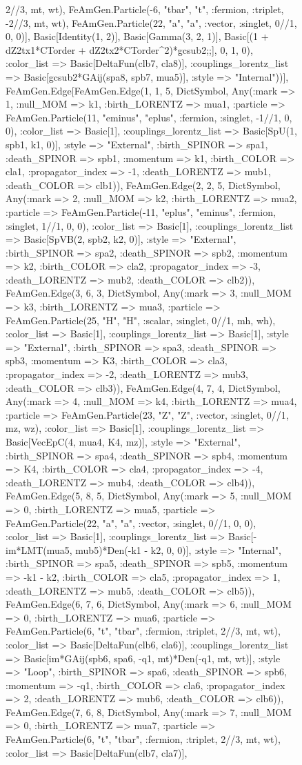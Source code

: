 \documentclass{revtex4}
\begin{document}
\begin{figure}[!htb]
\begin{center}
{2//3, mt, wt), FeAmGen.Particle(-6, "tbar", "t", :fermion, :triplet, -2//3, mt, wt), FeAmGen.Particle(22, "a", "a", :vector, :singlet, 0//1, 0, 0)], Basic[Identity(1, 2)], Basic[Gamma(3, 2, 1)], Basic[(1 + dZ2tx1*CTorder + dZ2tx2*CTorder^2)*gcsub2;;], 0, 1, 0), :color_list => Basic[DeltaFun(clb7, cla8)], :couplings_lorentz_list => Basic[gcsub2*GAij(spa8, spb7, mua5)], :style => "Internal"))], FeAmGen.Edge[FeAmGen.Edge(1, 1, 5, Dict{Symbol, Any}(:mark => 1, :null_MOM => k1, :birth_LORENTZ => mua1, :particle => FeAmGen.Particle(11, "eminus", "eplus", :fermion, :singlet, -1//1, 0, 0), :color_list => Basic[1], :couplings_lorentz_list => Basic[SpU(1, spb1, k1, 0)], :style => "External", :birth_SPINOR => spa1, :death_SPINOR => spb1, :momentum => k1, :birth_COLOR => cla1, :propagator_index => -1, :death_LORENTZ => mub1, :death_COLOR => clb1)), FeAmGen.Edge(2, 2, 5, Dict{Symbol, Any}(:mark => 2, :null_MOM => k2, :birth_LORENTZ => mua2, :particle => FeAmGen.Particle(-11, "eplus", "eminus", :fermion, :singlet, 1//1, 0, 0), :color_list => Basic[1], :couplings_lorentz_list => Basic[SpVB(2, spb2, k2, 0)], :style => "External", :birth_SPINOR => spa2, :death_SPINOR => spb2, :momentum => k2, :birth_COLOR => cla2, :propagator_index => -3, :death_LORENTZ => mub2, :death_COLOR => clb2)), FeAmGen.Edge(3, 6, 3, Dict{Symbol, Any}(:mark => 3, :null_MOM => k3, :birth_LORENTZ => mua3, :particle => FeAmGen.Particle(25, "H", "H", :scalar, :singlet, 0//1, mh, wh), :color_list => Basic[1], :couplings_lorentz_list => Basic[1], :style => "External", :birth_SPINOR => spa3, :death_SPINOR => spb3, :momentum => K3, :birth_COLOR => cla3, :propagator_index => -2, :death_LORENTZ => mub3, :death_COLOR => clb3)), FeAmGen.Edge(4, 7, 4, Dict{Symbol, Any}(:mark => 4, :null_MOM => k4, :birth_LORENTZ => mua4, :particle => FeAmGen.Particle(23, "Z", "Z", :vector, :singlet, 0//1, mz, wz), :color_list => Basic[1], :couplings_lorentz_list => Basic[VecEpC(4, mua4, K4, mz)], :style => "External", :birth_SPINOR => spa4, :death_SPINOR => spb4, :momentum => K4, :birth_COLOR => cla4, :propagator_index => -4, :death_LORENTZ => mub4, :death_COLOR => clb4)), FeAmGen.Edge(5, 8, 5, Dict{Symbol, Any}(:mark => 5, :null_MOM => 0, :birth_LORENTZ => mua5, :particle => FeAmGen.Particle(22, "a", "a", :vector, :singlet, 0//1, 0, 0), :color_list => Basic[1], :couplings_lorentz_list => Basic[-im*LMT(mua5, mub5)*Den(-k1 - k2, 0, 0)], :style => "Internal", :birth_SPINOR => spa5, :death_SPINOR => spb5, :momentum => -k1 - k2, :birth_COLOR => cla5, :propagator_index => 1, :death_LORENTZ => mub5, :death_COLOR => clb5)), FeAmGen.Edge(6, 7, 6, Dict{Symbol, Any}(:mark => 6, :null_MOM => 0, :birth_LORENTZ => mua6, :particle => FeAmGen.Particle(6, "t", "tbar", :fermion, :triplet, 2//3, mt, wt), :color_list => Basic[DeltaFun(clb6, cla6)], :couplings_lorentz_list => Basic[im*GAij(spb6, spa6, -q1, mt)*Den(-q1, mt, wt)], :style => "Loop", :birth_SPINOR => spa6, :death_SPINOR => spb6, :momentum => -q1, :birth_COLOR => cla6, :propagator_index => 2, :death_LORENTZ => mub6, :death_COLOR => clb6)), FeAmGen.Edge(7, 6, 8, Dict{Symbol, Any}(:mark => 7, :null_MOM => 0, :birth_LORENTZ => mua7, :particle => FeAmGen.Particle(6, "t", "tbar", :fermion, :triplet, 2//3, mt, wt), :color_list => Basic[DeltaFun(clb7, cla7)], }
\end{center}
\end{figure}
\end{document}
